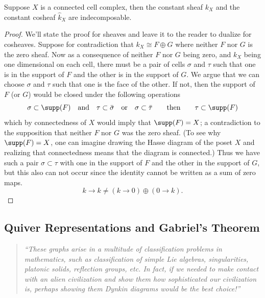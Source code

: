 \begin{lem}\label{lem:const_indecomp}
	Suppose $X$ is a connected cell complex, then the constant sheaf $k_X$ and the constant cosheaf $\hat{k}_X$ are indecomposable.
\end{lem}
\begin{proof}
	We'll state the proof for sheaves and leave it to the reader to dualize for cosheaves. Suppose for contradiction that $k_X\cong F\oplus G$ where neither $F$ nor $G$ is the zero sheaf. Now as a consequence of neither $F$ nor $G$ being zero, and $k_X$ being one dimensional on each cell, there must be a pair of cells $\sigma$ and $\tau$ such that one is in the support of $F$ and the other is in the support of $G$. We argue that we can choose $\sigma$ and $\tau$ such that one is the face of the other. If not, then the support of $F$ (or $G$) would be closed under the following operations
	\[
		\sigma\subset \supp(F) \quad \mathrm{and} \quad \tau\subset \bar{\sigma} \quad \mathrm{or} \quad \sigma \subset \bar{\tau} \qquad \mathrm{then} \qquad \tau\subset \supp(F)
	\]
	which by connectedness of $X$ would imply that $\supp(F)=X$; a contradiction to the supposition that neither $F$ nor $G$ was the zero sheaf. (To see why $\supp(F)=X$, one can imagine drawing the Hasse diagram of the poset $X$ and realizing that connectedness means that the diagram is connected.) Thus we have such a pair $\sigma\subset \tau$ with one in the support of $F$ and the other in the support of $G$, but this also can not occur since the identity cannot be written as a sum of zero maps.
	\[
		k\to k \neq (k\to 0)\oplus (0\to k).
	\]
\end{proof}

\subsection{Quiver Representations and Gabriel's Theorem}
\label{subsubsec:quivers}

\begin{quote}
{\em ``These graphs arise in a multitude of classification problems in mathematics, such as classification of simple Lie algebras, singularities, platonic solids, reflection groups, etc. In fact, if we needed to make contact with an alien civilization and show them how sophisticated our civilization is, perhaps showing them Dynkin diagrams would be the best choice!''}~\cite{etingof_rep}
\end{quote}

